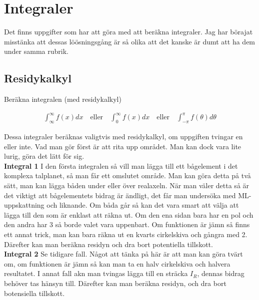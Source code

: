 \section{Integraler}
Det finns uppgifter som har att göra med att beräkna integraler. Jag har börajat misstänka att dessas löösningsgång är så olika att det kanske är dumt att ha dem under samma rubrik.

\subsection{Residykalkyl}

\begin{tcolorbox}
Beräkna integralen (med residykalkyl)

\begin{align*}
	\int_{\infty}^{\infty} f(x) dx \quad \text{eller} \quad \int_{0}^{\infty} f(x) dx \quad \text{eller} \quad  \int_{-\pi}^{\pi} f(\theta) d \theta
\end{align*}

\end{tcolorbox}
Dessa integraler beräknas valigtvis med residykalkyl, om uppgiften tvingar en eller inte. Vad man gör först är att rita upp området. Man kan dock vara lite lurig, göra det lätt för sig. \\ 

\textbf{Integral 1} I den första integralen så vill man lägga till ett bågelement i det komplexa talplanet, så man får ett omslutet område. Man kan göra detta på två sätt, man kan lägga båden under eller över realaxeln. När man väler detta så är det viktigt att bågelementets bidrag är ändligt, det får man undersöka med ML-uppskattning och liknande. Om båda går så kan det vara smart att välja att lägga till den som är enklast att räkna ut. Om den ena sidan bara har en pol och den andra har 3 så borde valet vara uppenbart. Om funktionen är jämn så finns ett annat trick, man kan bara räkna ut en kvarts cirkelskiva och gångra med 2. Därefter kan man beräkna residyn och dra bort potentiella tillskott. \\ 

\textbf{Integral 2} Se tidigare fall. Något att tänka på här är att man kan göra tvärt om, om funktionen är jämn så kan man ta en halv cirkelskiva och halvera resultatet. I annat fall akn man tvingas lägga till en sträcka $I_R$, dennas bidrag behöver tas hänsyn till. Därefter kan man beräkna residyn, och dra bort botensiella tillskott.\\ 

